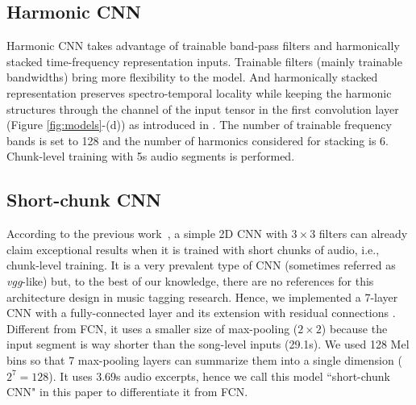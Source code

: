 \documentclass{article}
\begin{document}
\subsection{Harmonic CNN}
Harmonic CNN \cite{won2020data} takes advantage of trainable band-pass filters and harmonically stacked time-frequency representation inputs. Trainable filters (mainly trainable bandwidths) bring more flexibility to the model. And harmonically stacked representation preserves spectro-temporal locality while keeping the harmonic structures through the channel of the input tensor in the first convolution layer (Figure \ref{fig:models}-(d)) as introduced in \cite{bittner2017deep}. The number of trainable frequency bands is set to 128 and the number of harmonics considered for stacking is 6. Chunk-level training with 5s audio segments is performed.

\subsection{Short-chunk CNN}
According to the previous work~\cite{won2020data}, a simple 2D CNN with $3 \times 3$ filters can already claim exceptional results when it is trained with short chunks of audio, i.e., chunk-level training. It is a  very prevalent type of CNN (sometimes referred as \textit{vgg}-like) but, to the best of our knowledge, there are no references for this architecture design in music tagging research. Hence, we implemented a 7-layer CNN with a fully-connected layer and its extension with residual connections \cite{he2016deep}. Different from FCN, it uses a smaller size of max-pooling ($2 \times 2$) because the input segment is way shorter than the song-level inputs (29.1s). We used 128 Mel bins so that 7 max-pooling layers can summarize them into a single dimension ($2^7=128$). It uses 3.69s audio excerpts, hence we call this model ``short-chunk CNN" in this paper to differentiate it from FCN.


 
\end{document}
